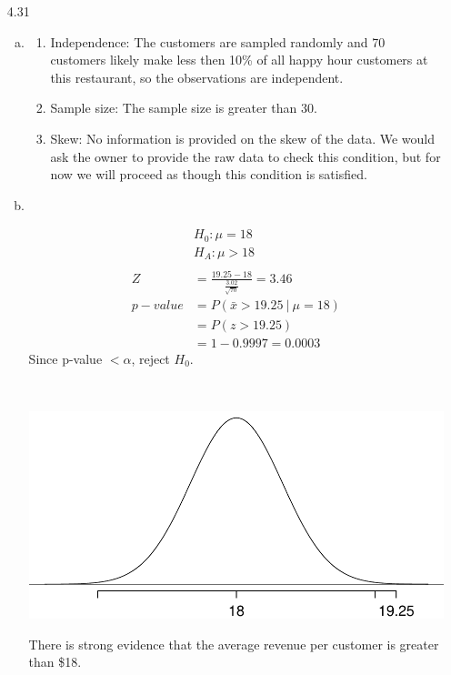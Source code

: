 \documentclass[11pt]{article}
\begin{document}
\begin{enumerate}
%

\item[4.31]$\:$ \\
\begin{enumerate}[(a)]

\item 
\begin{enumerate}[1.]
\item Independence: The customers are sampled randomly and 70 customers likely make less then 10\% of all happy hour customers at this restaurant, so the observations are independent.
\item Sample size: The sample size is greater than 30.
\item Skew: No information is provided on the skew of the data. We would ask the owner to provide the raw data to check this condition, but for now we will proceed as though this condition is satisfied.
\end{enumerate}

\item $\:$ \\
\begin{minipage}[c]{0.45\textwidth}
\begin{align*}
&H_0: \mu = 18 \\
&H_A: \mu > 18 \\
\: \\
Z &= \frac{19.25 - 18}{ \frac{3.02}{\sqrt{70}} } = 3.46 \\
p-value &= P(\bar{x} > 19.25~|~\mu = 18) \\
&= P(z > 19.25)  \\
&= 1 - 0.9997 = 0.0003
\end{align*}
Since p-value $< \alpha$, reject $H_0$. \\
\end{minipage}
\begin{minipage}[c]{0.05\textwidth}
$\:$
\end{minipage}
\begin{minipage}[c]{0.5\textwidth}
\begin{center}
\includegraphics[width=\textwidth]{figures/happyHour} 
\end{center}
There is strong evidence that the average revenue per customer is greater than \$18. 
\end{minipage}


\end{enumerate}
\end{enumerate}
\end{document}
